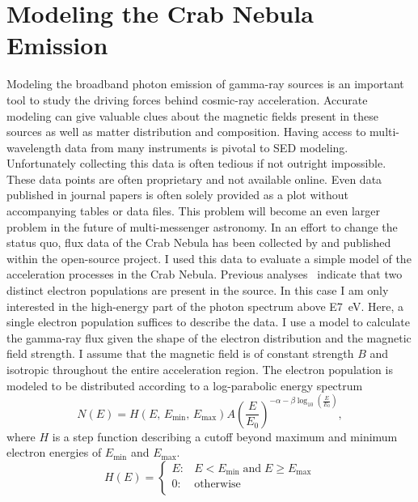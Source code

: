 \chapter{Modeling the Crab Nebula Emission}
\label{ch:crab-sed}
Modeling the broadband photon emission of gamma-ray sources is an important tool to study the driving forces behind cosmic-ray acceleration.
Accurate modeling can give valuable clues about the magnetic fields present in these sources as well as matter distribution and 
composition. 
Having access to multi-wavelength data from many instruments is pivotal to SED modeling. Unfortunately collecting this data is 
often tedious if not outright impossible. These data points are often proprietary and not available online. Even data published 
in journal papers is often solely provided as a plot without accompanying tables or data files. This problem will become 
an even larger problem in the future of multi-messenger astronomy. In an effort to change the status quo, flux data of the Crab Nebula has
been collected by \cite{meyer_2010,hegra-crab-data,buehler-crab-data} and published within the open-source \gammapy project.
I used this data to evaluate a simple model of the acceleration processes in the Crab Nebula. 
Previous analyses~\cite{meyer_2010,atoyan_crab} indicate that two distinct electron populations are present in the source. 
In this case I am only interested in the high-energy part of the photon spectrum above \SI{E7}{\eV}. Here, a single 
electron population suffices to describe the data. I use a \ssclong model to calculate
the gamma-ray flux given the shape of the electron distribution and the magnetic field strength. 
I assume that the magnetic field is of constant strength $B$ and isotropic throughout the entire acceleration region.
The electron population is modeled to be distributed according to a log-parabolic energy spectrum 
\begin{equation}
  \label{eq:electron_model}
    N(E) =H(E,\, E_{\text{min}}, \, E_{\text{max}}) A \left( \frac{E}{E_0} \right)^{-\alpha -\beta \log_{10}\left(\frac{E}{E_0}\right)},
\end{equation}
where $H$ is a step function describing a cutoff beyond maximum and minimum electron energies of $E_\text{min}$ and $E_\text{max}$.
\begin{equation*}
  \label{eq:step_function}
    H(E) = {
      \begin{cases}
        E : & E < E_{\text{min}} \; \text{and} \; E \geq E_{\text{max}} \\
        0 : & \text{otherwise} \\
      \end{cases}
    }
\end{equation*}
